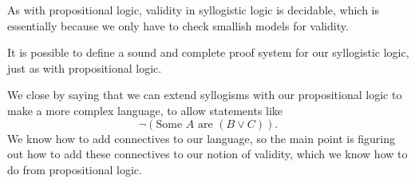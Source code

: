 \documentclass[../notes.tex]{subfiles}
\begin{document}
\begin{remark}
	As with propositional logic, validity in syllogistic logic is decidable, which is essentially because we only have to check smallish models for validity.
\end{remark}
\begin{remark}
	It is possible to define a sound and complete proof system for our syllogistic logic, just as with propositional logic.
\end{remark}
We close by saying that we can extend syllogisms with our propositional logic to make a more complex language, to allow statements like
\[\lnot(\textrm{Some }A\text{ are }(B\lor C)).\]
We know how to add connectives to our language, so the main point is figuring out how to add these connectives to our notion of validity, which we know how to do from propositional logic.
\end{document}
